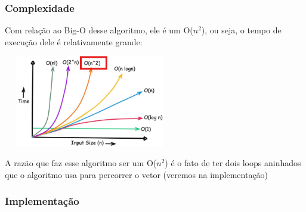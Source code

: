 \documentclass{report}
\begin{document}
	
	\subsubsection{Complexidade}
	Com relação ao Big-O desse algoritmo, ele é um O($n^{2}$), ou seja, o tempo de execução dele é relativamente grande:
	
	\begin{center}
		
		\includegraphics[width=7.5cm,height=4cm,keepaspectratio=false]{imagens/bubble_comple.png}
		
	\end{center}
	
	A razão que faz esse algoritmo ser um O($n^{2}$) é o fato de ter dois loops aninhados que o algoritmo usa para percorrer o vetor (veremos na implementação)
	
	
	\subsubsection{Implementação}
	
\end{document}
